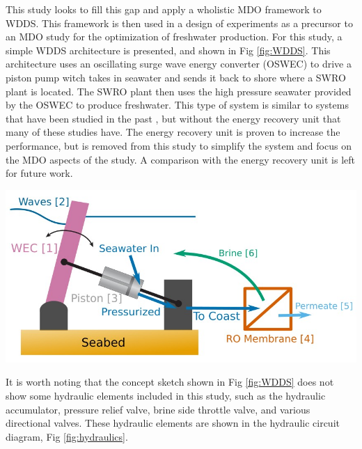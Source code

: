 \documentclass[twocolumn,10pt]{asme2e}
\begin{document}
This study looks to fill this gap and apply a wholistic MDO framework to WDDS. This framework is then used in a design of experiments as a precursor to an MDO study for the optimization of freshwater production. For this study, a simple WDDS architecture is presented, and shown in Fig \ref{fig:WDDS}. This architecture uses an oscillating surge wave energy converter (OSWEC) to drive a piston pump witch takes in seawater and sends it back to shore where a SWRO plant is located. The SWRO plant then uses the high pressure seawater provided by the OSWEC to produce freshwater. This type of system is similar to systems that have been studied in the past \cite{Yu2018,Suchithra2022,Mi2023,Simmons2024}, but without the energy recovery unit that many of these studies have. The energy recovery unit is proven to increase the performance, but is removed from this study to simplify the system and focus on the MDO aspects of the study. A comparison with the energy recovery unit is left for future work.

\begin{center}
    \includegraphics[width=\linewidth]{../figs/WDDS.png}
    \label{fig:WDDS}
\end{center}

It is worth noting that the concept sketch shown in Fig \ref{fig:WDDS} does not show some hydraulic elements included in this study, such as the hydraulic accumulator, pressure relief valve, brine side throttle valve, and various directional valves. These hydraulic elements are shown in the hydraulic circuit diagram, Fig \ref{fig:hydraulics}.
\end{document}
